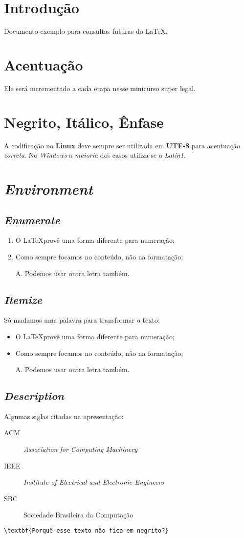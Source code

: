 \documentclass{article}
\begin{document}
	\section{Introdução}
		Documento exemplo para consultas futuras do \LaTeX.

	\section{Acentuação}		
		Ele será incrementado a cada etapa nesse minicurso super legal.
	
	\section{Negrito, Itálico, Ênfase}
		A codificação no \textbf{Linux} deve \huge sempre \normalsize ser utilizada em \textbf{UTF-8} para acentuação \emph{correta}. No \textit{Windows} a \emph{maioria} dos casos utiliza-se o \textit{Latin1}.
		
	\section{\textit{Environment}}

		\subsection{\textit{Enumerate}}
			\begin{enumerate}
				\item	O \LaTeX provê uma forma diferente para numeração;
				\item	Como sempre focamos no conteúdo, não na formatação;
				\item[A.]	Podemos usar outra letra também.
			\end{enumerate}
	
		\subsection{\textit{Itemize}}
			Só mudamos uma palavra para transformar o texto:
			\begin{itemize}
				\item	O \LaTeX provê uma forma diferente para numeração;
				\item	Como sempre focamos no conteúdo, não na formatação;
				\item[A.]	Podemos usar outra letra também.
			\end{itemize}
	
		\subsection{\textit{Description}}
			Algumas siglas citadas na apresentação:
			\begin{description}
				\item[ACM] \textit{Association for Computing Machinery}
				\item[IEEE]	\textit{Institute of Electrical and Electronic Engineers}
				\item[SBC] Sociedade Brasileira da Computação
			\end{description}

		\verb|\textbf{Porquê esse texto não fica em negrito?}|
\end{document}
